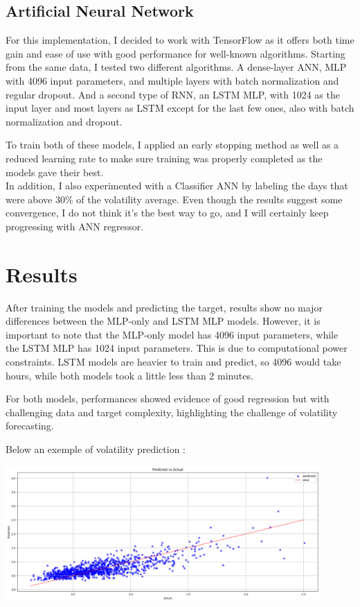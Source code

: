 \documentclass[letterpaper,11pt]{article}
\begin{document}
\subsection{Artificial Neural Network}

For this implementation, I decided to work with TensorFlow as it offers both time gain and ease of use with good performance for well-known algorithms.  
Starting from the same data, I tested two different algorithms. A dense-layer ANN, MLP with 4096 input parameters, and multiple layers with batch normalization and regular dropout. And a second type of RNN, an LSTM MLP, with 1024 as the input layer and most layers as LSTM except for the last few ones, also with batch normalization and dropout.

To train both of these models, I applied an early stopping method as well as a reduced learning rate to make sure training was properly completed as the models gave their best.\\

In addition, I also experimented with a Classifier ANN by labeling the days that were above 30\% of the volatility average. Even though the results suggest some convergence, I do not think it’s the best way to go, and I will certainly keep progressing with ANN regressor.

\section{Results}

After training the models and predicting the target, results show no major differences between the MLP-only and LSTM MLP models. However, it is important to note that the MLP-only model has 4096 input parameters, while the LSTM MLP has 1024 input parameters. This is due to computational power constraints. LSTM models are heavier to train and predict, so 4096 would take hours, while both models took a little less than 2 minutes.

For both models, performances showed evidence of good regression but with challenging data and target complexity, highlighting the challenge of volatility forecasting.

Below an exemple of volatility prediction :

\begin{center}
\includegraphics[width=0.9\textwidth]{img/PVA_R.png}
\end{center}
\end{document}
